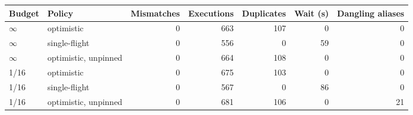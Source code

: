 \begin{tabular}{@{}llrrrrr@{}}
\toprule
Budget & Policy & Mismatches & Executions & Duplicates & Wait (s) & Dangling aliases \\
\midrule
$\infty$ & optimistic & 0 & 663 & 107 & 0 & 0 \\
$\infty$ & single-flight & 0 & 556 & 0 & 59 & 0 \\
$\infty$ & optimistic, unpinned & 0 & 664 & 108 & 0 & 0 \\
1/16 & optimistic & 0 & 675 & 103 & 0 & 0 \\
1/16 & single-flight & 0 & 567 & 0 & 86 & 0 \\
1/16 & optimistic, unpinned & 0 & 681 & 106 & 0 & 21 \\
\bottomrule
\end{tabular}
